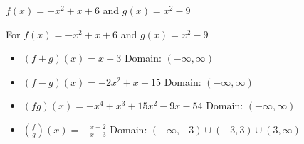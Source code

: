 {$f(x) = -x^2+x+6$ and $g(x) = x^2-9$}
{For $f(x) = -x^2+x+6$ and $g(x) = x^2-9$

\begin{itemize}
\item $(f+g)(x) = x-3$
      Domain: $(-\infty, \infty)$
\item $(f-g)(x) = -2x^2+x+15$
      Domain:  $(-\infty, \infty)$
\item $(fg)(x) = -x^4+x^3+15x^2-9x-54$
      Domain: $(-\infty, \infty)$
\item $\left(\frac{f}{g}\right)(x) = -\frac{x+2}{x+3}$
      Domain:  $\left(-\infty, -3 \right) \cup \left(-3, 3 \right) \cup (3, \infty)$
\end{itemize}
}
